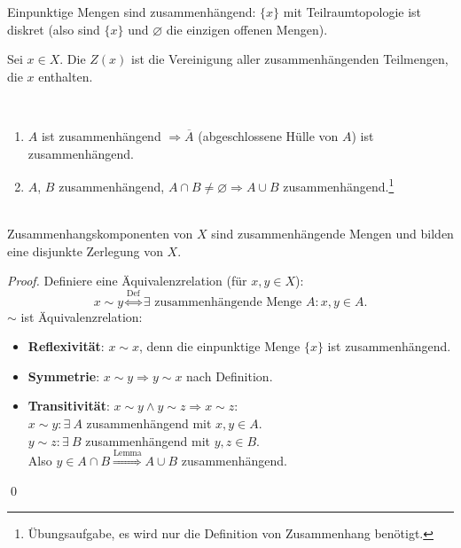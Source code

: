 \begin{remark}
  Einpunktige Mengen sind zusammenhängend: \( \{ x \} \) mit Teilraumtopologie ist diskret (also sind \( \{ x \} \) und \( \varnothing \) die einzigen offenen Mengen).
\end{remark}

\begin{definition}[Zusammenhangskomponente]\label{def:zusammenhangskomponente}
  Sei \( x \in X \). Die  \( Z(x) \) ist die Vereinigung aller zusammenhängenden Teilmengen, die \( x \) enthalten.
\end{definition}

\begin{lemma}
  \
  \begin{enumerate}
    \item \( A \) ist zusammenhängend \( \Rightarrow \overline{A} \) (abgeschlossene Hülle von \( A \)) ist zusammenhängend.
    \item \( A \), \( B \) zusammenhängend, \( A \cap B \neq \varnothing \Rightarrow A \cup B \) zusammenhängend.\footnote{Übungsaufgabe, es wird nur die Definition von Zusammenhang benötigt.} 
  \end{enumerate}
\end{lemma}

\begin{remark}
  \  \\ Zusammenhangskomponenten von \( X \) sind zusammenhängende Mengen und bilden eine disjunkte Zerlegung von \( X \).
  \begin{proof}
    Definiere eine Äquivalenzrelation (für \( x, y \in X \)):
    \begin{equation*}
      x \sim y \overset{\text{Def}}{\Leftrightarrow} \exists \text{ zusammenhängende Menge } A : x, y \in A\text{.}
    \end{equation*}
    \( \sim \) ist Äquivalenzrelation:
    \begin{itemize}
      \item \textbf{Reflexivität}: \( x \sim x \), denn die einpunktige Menge \( \{ x \} \) ist zusammenhängend. 
      \item \textbf{Symmetrie}: \( x \sim y \Rightarrow y \sim x \) nach Definition.
      \item \textbf{Transitivität}: \( x \sim y \wedge y \sim z \Rightarrow x \sim z \): \\
        \( x \sim y: \exists \ A \) zusammenhängend mit \( x,y \in A \). \\
        \( y \sim z: \exists \ B \) zusammenhängend mit \( y,z \in B \). \\
        Also \( y \in A \cap B \overset{\text{Lemma}}{\Rightarrow} A \cup B \) zusammenhängend.
    \end{itemize}
    \qed{}
  \end{proof}
\end{remark}

